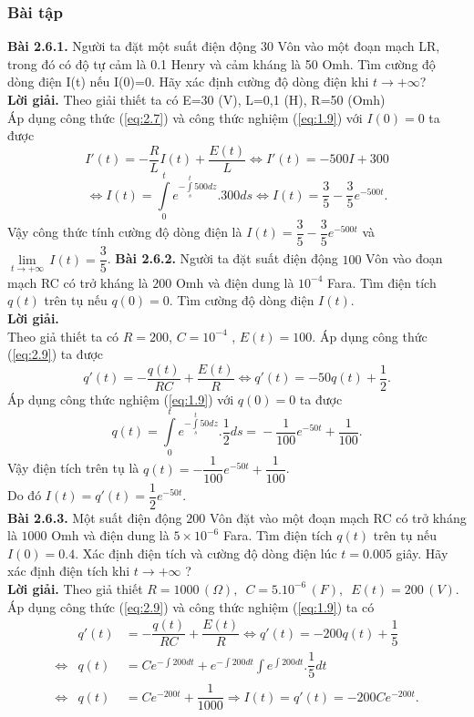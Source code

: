 \subsubsection{Bài tập}
\noindent\textbf{Bài 2.6.1.} Người ta đặt một suất điện động 30 Vôn vào một đoạn mạch LR, trong đó có độ tự cảm là 0.1 Henry và cảm kháng là 50 Omh. Tìm cường độ dòng điện I(t) nếu I(0)=0. Hãy xác định cường độ dòng điện khi $t\to +\infty $? \\
\textbf{Lời giải.} Theo giải thiết ta có E=30 (V), L=0,1 (H), R=50 (Omh)\\
Áp dụng công thức (\ref{eq:2.7}) và công thức nghiệm (\ref{eq:1.9}) với $I(0)=0$ ta được
$$ {I}'(t)=-\dfrac{R}{L}I(t)+\dfrac{E(t)}{L}\Leftrightarrow {I}'(t)=-500I+300 $$
	$$ \Leftrightarrow I(t)=\int\limits_{0}^{t}{{{e}^{-\int\limits_{s}^{t}{500dz}}}.300ds}\Leftrightarrow I(t)=\dfrac{3}{5}-\dfrac{3}{5}{{e}^{-500t}}. $$
Vậy công thức tính cường độ dòng điện là $I(t)=\dfrac{3}{5}-\dfrac{3}{5}{{e}^{-500t}}$   và  $\underset{t\to +\infty }{\mathop{\lim }}\,I(t)=\dfrac{3}{5}$. \newpage
\noindent\textbf{Bài 2.6.2.} Người ta đặt suất điện động $100$ Vôn vào đoạn mạch RC có trở kháng là $200$ Omh và điện dung là $10^{-4}$ Fara. Tìm điện tích $q(t)$ trên tụ nếu $q(0)=0$. Tìm cường độ dòng điện $I(t).$\\
\textbf{Lời giải. }\\
Theo giả thiết ta có $R=200$, $C={{10}^{-4}}$ , $E(t)=100$. Áp dụng công thức (\ref{eq:2.9}) ta được
$$q'(t)=-\dfrac{q(t)}{RC}+\dfrac{E(t)}{R}\Leftrightarrow q'(t)=-50q(t)+\dfrac{1}{2}.$$
Áp dụng công thức nghiệm (\ref{eq:1.9}) với $q(0)=0$ ta được
$$q(t)=\int\limits_{0}^{t}{{{e}^{-\int\limits_{s}^{t}{50dz}}}.\dfrac{1}{2}ds=}
-\dfrac{1}{100}{{e}^{-50t}}+\dfrac{1}{100}.$$
Vậy điện tích trên tụ là $q(t)=-\dfrac{1}{100}{{e}^{-50t}}+\dfrac{1}{100}$.\\
Do đó $I(t)=q'(t)=\dfrac{1}{2}{{e}^{-50t}}$.\\
\textbf{Bài 2.6.3.} Một suất điện động $200$ Vôn đặt vào một đoạn mạch RC có trở kháng là $1000$ Omh và điện dung là $5\times10^{-6}$ Fara. Tìm điện tích $q(t)$ trên tụ nếu $I(0)=0.4$. Xác định điện tích và cường độ dòng điện lúc $t= 0.005$ giây. Hãy xác định điện tích khi $t\to +\infty $ ?\\
\textbf{Lời giải.} Theo giả thiết $R=1000\,(\Omega ),\,\,\,C={{5.10}^{-6}}\,(F),\,\,\,E(t)=200\,(V)$.\\
Áp dụng công thức (\ref{eq:2.9}) và công thức nghiệm (\ref{eq:1.9}) ta có
$$ 
\begin{array}{lll}
&q'(t)&=-\dfrac{q(t)}{RC}+\dfrac{E(t)}{R}\Leftrightarrow q'(t)=-200q(t)+\dfrac{1}{5} \\
 \Leftrightarrow &q(t)&=C{{e}^{-\int{200}dt}}+{{e}^{-\int{200}dt}}\int{{{e}^{\int{200}dt}}.\dfrac{1}{5}dt} \\
\Leftrightarrow &q(t)&=C{{e}^{-200t}}+\dfrac{1}{1000}\Rightarrow I(t)={q}'(t)=-200C{{e}^{-200t}}.
\end{array}
$$
